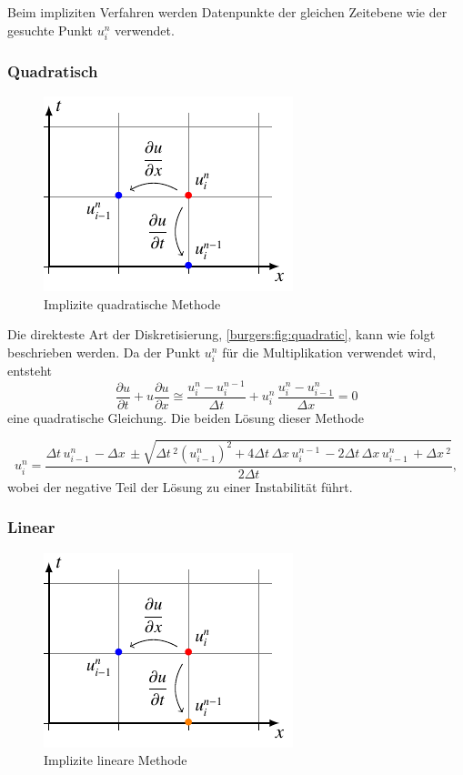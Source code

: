 	Beim impliziten Verfahren werden Datenpunkte der gleichen Zeitebene wie der gesuchte Punkt $u_{i}^{n}$ verwendet.


\subsubsection{Quadratisch}
     \begin{figure}
	\centering
	\includegraphics[height=.4\textwidth]{papers/burgers/BurgersEquation/tikz/quadratic/quadratic.pdf}
	\caption{Implizite quadratische Methode}
	\label{burgers:fig:quadratic}
	\end{figure}

	Die direkteste Art der Diskretisierung, \autoref{burgers:fig:quadratic}, kann wie folgt beschrieben werden.
	Da der Punkt $u_{i}^{n}$ f\"ur die Multiplikation verwendet wird, entsteht
	\begin{equation}
	\frac {\partial u}{\partial t}+u{\frac {\partial u}{\partial x}} \cong \frac{u_{i}^{n}-u_{i}^{n-1}}{\Delta t}+ u_{i}^{n}\, \frac{u_{i}^{n}-u_{i-1}^{n}}{\Delta x}=0
	\end{equation}
	eine quadratische Gleichung.
	Die beiden L\"osung dieser Methode

	\begin{equation}
	  u_{i}^{n} =
	     \dfrac{\Delta{t}\, u^{n}_{i-1}\, - \Delta{x}\, \pm \sqrt{\Delta{t}\,^{2} (u^{n}_{i-1})^{2} + 4 \Delta{t}\, \Delta{x}\, u^{n-1}_{i}\, - 2 \Delta{t}\, \Delta{x}\, u^{n}_{i-1}\, + \Delta{x}\,^{2}}}{2 \Delta{t}},
	\end{equation}
	wobei der negative Teil der L\"osung zu einer Instabilität führt.


	\subsubsection{Linear}
	\label{burgers:sec:imp_lin}
	     \begin{figure}
		\centering
		\includegraphics[height=.4\textwidth]{papers/burgers/BurgersEquation/tikz/linear5/linear5.pdf}
		\caption{Implizite lineare Methode}
		\label{burgers:fig:linear5}
		\end{figure}

